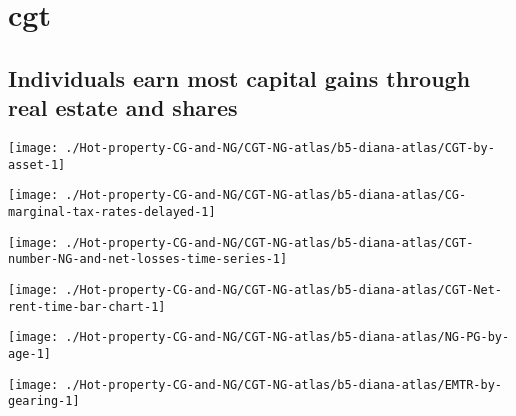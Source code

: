 \documentclass[tikz]{standalone}\usepackage[]{graphicx}\usepackage[]{color}
\newenvironment{knitrout}{}{} %
\begin{document}
\section{cgt}


\subsection{Individuals earn most capital gains through real estate and shares}
\begin{knitrout}
\color{fgcolor}
\texttt{[image: ./Hot-property-CG-and-NG/CGT-NG-atlas/b5-diana-atlas/CGT-by-asset-1]} 

\end{knitrout}

\begin{knitrout}
\color{fgcolor}
\texttt{[image: ./Hot-property-CG-and-NG/CGT-NG-atlas/b5-diana-atlas/CG-marginal-tax-rates-delayed-1]} 

\end{knitrout}

\begin{knitrout}
\color{fgcolor}
\texttt{[image: ./Hot-property-CG-and-NG/CGT-NG-atlas/b5-diana-atlas/CGT-number-NG-and-net-losses-time-series-1]} 

\end{knitrout}

\begin{knitrout}
\color{fgcolor}
\texttt{[image: ./Hot-property-CG-and-NG/CGT-NG-atlas/b5-diana-atlas/CGT-Net-rent-time-bar-chart-1]} 

\end{knitrout}

\begin{knitrout}
\color{fgcolor}
\texttt{[image: ./Hot-property-CG-and-NG/CGT-NG-atlas/b5-diana-atlas/NG-PG-by-age-1]} 

\end{knitrout}

\begin{knitrout}
\color{fgcolor}
\texttt{[image: ./Hot-property-CG-and-NG/CGT-NG-atlas/b5-diana-atlas/EMTR-by-gearing-1]} 

\end{knitrout}
\end{document}
